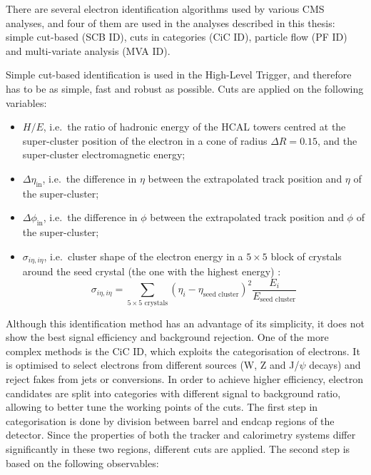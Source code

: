 There are several electron identification algorithms used by various CMS analyses, and four of them are used in the
analyses described in this thesis: simple cut-based (SCB ID), cuts in categories (CiC ID), particle flow (PF ID) and
multi-variate analysis (MVA ID).

Simple cut-based identification is used in the High-Level Trigger, and therefore has to be as simple, fast and
robust as possible. Cuts are applied on the following variables:

\begin{itemize}
  \item $H/E$, i.e.\ the ratio of hadronic energy of the HCAL towers centred at the super-cluster position of the
  electron in a cone of radius $\Delta R = 0.15$, and the super-cluster electromagnetic energy;
  \item $\Delta\eta_{\text{in}}$, i.e.\ the difference in $\eta$ between the extrapolated track position and $\eta$ of
  the super-cluster;
  \item $\Delta\phi_{\text{in}}$, i.e.\ the difference in $\phi$ between the extrapolated track position and $\phi$ of
  the super-cluster;
  \item $\sigma_{i\eta, i\eta}$, i.e.\ cluster shape of the electron energy in a $5\times5$ block of crystals around the
  seed crystal (the one with the highest energy) \autocite{electron_reconstruction}:
  \begin{equation}
  \label{eq:cluster_shape}
    \sigma_{i\eta, i\eta} = \sum_{5\times5 \text{ crystals}} \left(\eta_i - \eta_\text{seed cluster}\right)^2
    \frac{E_i}{E_{\text{seed cluster}}}
  \end{equation}
\end{itemize}

Although this identification method has an advantage of its simplicity, it does not show the best signal efficiency and
background rejection. One of the more complex methods is the CiC ID, which exploits the categorisation of electrons. It
is optimised to select electrons from different sources (W, Z and J/$\psi$ decays) and reject fakes from jets or
conversions. In order to achieve higher efficiency, electron candidates are split into categories with different signal
to background ratio, allowing to better tune the working points of the cuts. The first step in categorisation is done by
division between barrel and endcap regions of the detector. Since the properties of both the tracker and calorimetry
systems differ significantly in these two regions, different cuts are applied. The second step is based on the following
observables:

